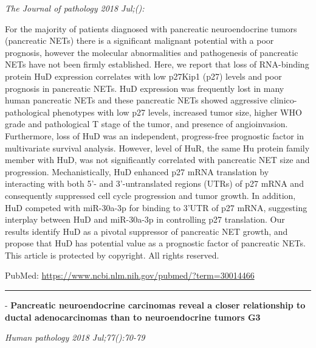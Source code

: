 \documentclass[]{article}
\begin{document}
\emph{The Journal of pathology 2018 Jul;():}

For the majority of patients diagnosed with pancreatic neuroendocrine
tumors (pancreatic NETs) there is a significant malignant potential with
a poor prognosis, however the molecular abnormalities and pathogenesis
of pancreatic NETs have not been firmly established. Here, we report
that loss of RNA-binding protein HuD expression correlates with low
p27Kip1 (p27) levels and poor prognosis in pancreatic NETs. HuD
expression was frequently lost in many human pancreatic NETs and these
pancreatic NETs showed aggressive clinico-pathological phenotypes with
low p27 levels, increased tumor size, higher WHO grade and pathological
T stage of the tumor, and presence of angioinvasion. Furthermore, loss
of HuD was an independent, progress-free prognostic factor in
multivariate survival analysis. However, level of HuR, the same Hu
protein family member with HuD, was not significantly correlated with
pancreatic NET size and progression. Mechanistically, HuD enhanced p27
mRNA translation by interacting with both 5'- and 3'-untranslated
regions (UTRs) of p27 mRNA and consequently suppressed cell cycle
progression and tumor growth. In addition, HuD competed with miR-30a-3p
for binding to 3'UTR of p27 mRNA, suggesting interplay between HuD and
miR-30a-3p in controlling p27 translation. Our results identify HuD as a
pivotal suppressor of pancreatic NET growth, and propose that HuD has
potential value as a prognostic factor of pancreatic NETs. This article
is protected by copyright. All rights reserved.

PubMed: \url{https://www.ncbi.nlm.nih.gov/pubmed/?term=30014466}

{}

{}

\begin{center}\rule{0.5\linewidth}{\linethickness}\end{center}

 - \textbf{Pancreatic neuroendocrine carcinomas reveal a closer
relationship to ductal adenocarcinomas than to neuroendocrine tumors G3}

\emph{Human pathology 2018 Jul;77():70-79}
\end{document}
